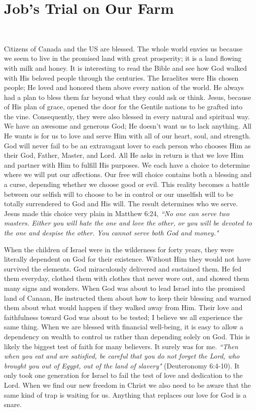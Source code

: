 \documentclass[oneside,12pt]{book}
\begin{document}
\chapter{Job's Trial on Our Farm}
\

Citizens of Canada and the US are blessed. The whole world envies us because we seem to live in the promised land with great prosperity; it is a land flowing with milk and honey. It is  interesting to read the Bible and see how God walked with His beloved people through the centuries. The Israelites were His chosen people; He loved and honored them above every nation of the world. He always had a plan to bless them far beyond what they could ask or think. Jesus, because of His plan of grace, opened the door for the Gentile nations to be grafted into the vine. Consequently, they were also blessed in every natural and spiritual way. We have an awesome and generous God; He doesn't want us to lack anything. All He wants is for us to love and serve Him with all of our heart, soul, and strength. God will never fail to be an extravagant lover to each person who chooses Him as their God, Father, Master, and Lord. All He asks in return is that we love Him and partner with Him to fulfill His purposes. We each have a choice to determine where we will put our affections. Our free will choice contains both a blessing and a curse, depending whether we choose good or evil. This reality becomes a battle between our selfish will to choose to be in control or our unselfish will to be totally surrendered to God and His will. The result determines who we serve. Jesus made this choice very plain in Matthew 6:24, \textit{``No one can serve two masters. Either you will hate the one and love the other, or you will be devoted to the one and despise the other. You cannot serve both God and money."}

When the children of Israel were in the wilderness for forty years, they were literally dependent on God for their existence. Without Him they would not have survived the elements. God miraculously delivered and sustained them. He fed them everyday, clothed them with clothes that never wore out, and showed them many signs and wonders. When God was about to lead Israel into the promised land of Canaan, He instructed them about how to keep their blessing and warned them about what would happen if they walked away from Him. Their love and faithfulness toward God was about to be tested; I believe we all experience the same thing. When we are blessed with financial well-being, it is easy to allow a dependency on wealth to control us rather than depending solely on God. This is likely the biggest test of faith for many believers. It surely was for me. \textit{``Then when you eat and are satisfied, be careful that you do not forget the Lord, who brought you out of Egypt, out of the land of slavery"} (Deuteronomy 6:4-10). It only took one generation for Israel to fail the test of love and dedication to the Lord. When we find our new freedom in Christ we also need to be aware that the same kind of trap is waiting for us. Anything that replaces our love for God is a snare. 
\end{document}
